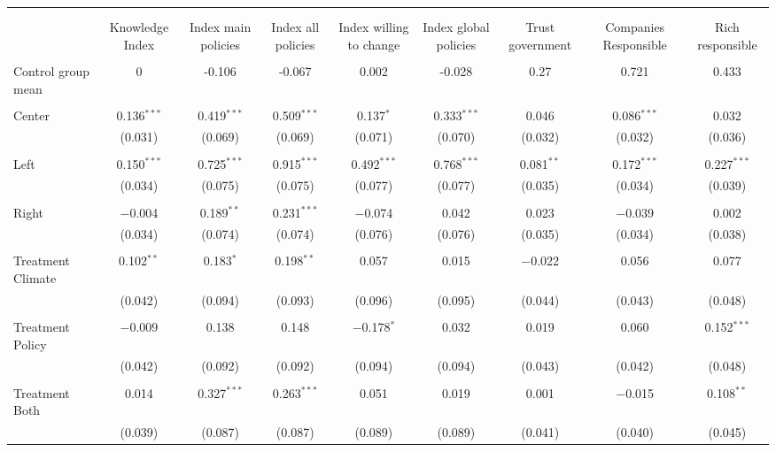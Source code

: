 
\begin{tabular}{@{\extracolsep{5pt}}lcccccccc} 
\\[-1.8ex]\hline 
\hline \\[-1.8ex] 
\\[-1.8ex] & Knowledge Index & Index main policies & Index all policies & Index willing to change & Index global policies & Trust government & Companies Responsible & Rich responsible \\ 
\hline \\[-1.8ex] 
 Control group mean & 0 & -0.106 & -0.067 & 0.002 & -0.028 & 0.27 & 0.721 & 0.433  \\ \hline \\[-1.8ex] Center & 0.136$^{***}$ & 0.419$^{***}$ & 0.509$^{***}$ & 0.137$^{*}$ & 0.333$^{***}$ & 0.046 & 0.086$^{***}$ & 0.032 \\ 
  & (0.031) & (0.069) & (0.069) & (0.071) & (0.070) & (0.032) & (0.032) & (0.036) \\ 
  & & & & & & & & \\ 
 Left & 0.150$^{***}$ & 0.725$^{***}$ & 0.915$^{***}$ & 0.492$^{***}$ & 0.768$^{***}$ & 0.081$^{**}$ & 0.172$^{***}$ & 0.227$^{***}$ \\ 
  & (0.034) & (0.075) & (0.075) & (0.077) & (0.077) & (0.035) & (0.034) & (0.039) \\ 
  & & & & & & & & \\ 
 Right & $-$0.004 & 0.189$^{**}$ & 0.231$^{***}$ & $-$0.074 & 0.042 & 0.023 & $-$0.039 & 0.002 \\ 
  & (0.034) & (0.074) & (0.074) & (0.076) & (0.076) & (0.035) & (0.034) & (0.038) \\ 
  & & & & & & & & \\ 
 Treatment Climate & 0.102$^{**}$ & 0.183$^{*}$ & 0.198$^{**}$ & 0.057 & 0.015 & $-$0.022 & 0.056 & 0.077 \\ 
  & (0.042) & (0.094) & (0.093) & (0.096) & (0.095) & (0.044) & (0.043) & (0.048) \\ 
  & & & & & & & & \\ 
 Treatment Policy & $-$0.009 & 0.138 & 0.148 & $-$0.178$^{*}$ & 0.032 & 0.019 & 0.060 & 0.152$^{***}$ \\ 
  & (0.042) & (0.092) & (0.092) & (0.094) & (0.094) & (0.043) & (0.042) & (0.048) \\ 
  & & & & & & & & \\ 
 Treatment Both & 0.014 & 0.327$^{***}$ & 0.263$^{***}$ & 0.051 & 0.019 & 0.001 & $-$0.015 & 0.108$^{**}$ \\ 
  & (0.039) & (0.087) & (0.087) & (0.089) & (0.089) & (0.041) & (0.040) & (0.045) \\ 

\end{tabular}
